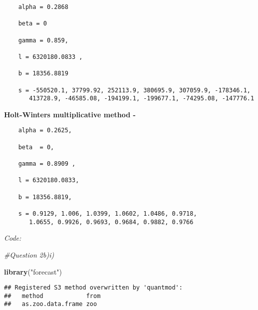 \documentclass[]{article}
\newenvironment{Shaded}{\begin{snugshade}}{\end{snugshade}}
\newcommand{\CommentTok}[1]{\textcolor[rgb]{0.56,0.35,0.01}{\textit{#1}}}
\newcommand{\DataTypeTok}[1]{\textcolor[rgb]{0.13,0.29,0.53}{#1}}
\newcommand{\DecValTok}[1]{\textcolor[rgb]{0.00,0.00,0.81}{#1}}
\newcommand{\KeywordTok}[1]{\textcolor[rgb]{0.13,0.29,0.53}{\textbf{#1}}}
\newcommand{\NormalTok}[1]{#1}
\newcommand{\OperatorTok}[1]{\textcolor[rgb]{0.81,0.36,0.00}{\textbf{#1}}}
\newcommand{\OtherTok}[1]{\textcolor[rgb]{0.56,0.35,0.01}{#1}}
\newcommand{\StringTok}[1]{\textcolor[rgb]{0.31,0.60,0.02}{#1}}
\begin{document}
\begin{verbatim}
    alpha = 0.2868
    
    beta = 0
    
    gamma = 0.859,
    
    l = 6320180.0833 ,
    
    b = 18356.8819
    
    s = -550520.1, 37799.92, 252113.9, 380695.9, 307059.9, -178346.1,
       413728.9, -46585.08, -194199.1, -199677.1, -74295.08, -147776.1
\end{verbatim}

\textbf{Holt-Winters multiplicative method - }

\begin{verbatim}
    alpha = 0.2625, 
    
    beta  = 0, 
    
    gamma = 0.8909 , 
    
    l = 6320180.0833, 
    
    b = 18356.8819, 
    
    s = 0.9129, 1.006, 1.0399, 1.0602, 1.0486, 0.9718,
       1.0655, 0.9926, 0.9693, 0.9684, 0.9882, 0.9766
\end{verbatim}

\emph{Code:}

\begin{Shaded}
\begin{Highlighting}[]
\CommentTok{#Question 2b)i)}

\KeywordTok{library}\NormalTok{(}\StringTok{"forecast"}\NormalTok{)}
\end{Highlighting}
\end{Shaded}

\begin{verbatim}
## Registered S3 method overwritten by 'quantmod':
##   method            from
##   as.zoo.data.frame zoo
\end{verbatim}

\begin{Shaded}
\end{Shaded}
\end{document}
